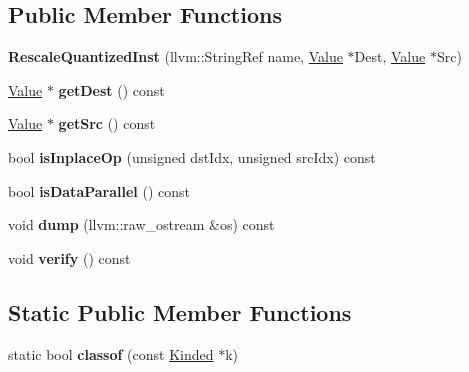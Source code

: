 \subsection*{Public Member Functions}
\begin{DoxyCompactItemize}
\item 
\mbox{\label{classglow_1_1_rescale_quantized_inst_ab07a82fbb705b8e926072fdbcce5926b}} 
{\bfseries Rescale\+Quantized\+Inst} (llvm\+::\+String\+Ref name, \hyperlink{classglow_1_1_value}{Value} $\ast$Dest, \hyperlink{classglow_1_1_value}{Value} $\ast$Src)
\item 
\mbox{\label{classglow_1_1_rescale_quantized_inst_ae23f47dddd4d97de3be44cfc334f40c0}} 
\hyperlink{classglow_1_1_value}{Value} $\ast$ {\bfseries get\+Dest} () const
\item 
\mbox{\label{classglow_1_1_rescale_quantized_inst_a0ef66eeb242bf7b83b87e887937afb81}} 
\hyperlink{classglow_1_1_value}{Value} $\ast$ {\bfseries get\+Src} () const
\item 
\mbox{\label{classglow_1_1_rescale_quantized_inst_acf4e78206938052478c6e4dfe34038c8}} 
bool {\bfseries is\+Inplace\+Op} (unsigned dst\+Idx, unsigned src\+Idx) const
\item 
\mbox{\label{classglow_1_1_rescale_quantized_inst_aef7bca154bfbe773cb35ef4dab081f87}} 
bool {\bfseries is\+Data\+Parallel} () const
\item 
\mbox{\label{classglow_1_1_rescale_quantized_inst_a81a8a7c540827e066a6762dc8ab01a33}} 
void {\bfseries dump} (llvm\+::raw\+\_\+ostream \&os) const
\item 
\mbox{\label{classglow_1_1_rescale_quantized_inst_a1ebb0519505439b96b8f75c0e1c808a5}} 
void {\bfseries verify} () const
\end{DoxyCompactItemize}
\subsection*{Static Public Member Functions}
\begin{DoxyCompactItemize}
\item 
\mbox{\label{classglow_1_1_rescale_quantized_inst_adeba8503ca7b35e521f479dc15da9315}} 
static bool {\bfseries classof} (const \hyperlink{classglow_1_1_kinded}{Kinded} $\ast$k)
\end{DoxyCompactItemize}
